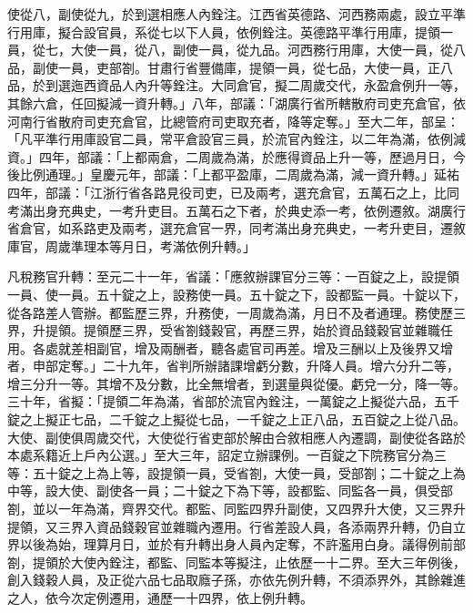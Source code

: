 \begin{pinyinscope}
使從八，副使從九，於到選相應人內銓注。江西省英德路、河西務兩處，設立平準行用庫，擬合設官員，系從七以下人員，依例銓注。英德路平準行用庫，提領一員，從七，大使一員，從八，副使一員，從九品。河西務行用庫，大使一員，從八品，副使一員，吏部劄。甘肅行省豐備庫，提領一員，從七品，大使一員，正八品，於到選迤西資品人內升等銓注。大同倉官，擬二周歲交代，永盈倉例升一等，其餘六倉，任回擬減一資升轉。」八年，部議：「湖廣行省所轄散府司吏充倉官，依河南行省散府司吏充倉官，比總管府司吏取充者，降等定奪。」至大二年，部呈：「凡平準行用庫設官二員，常平倉設官三員，於流官內銓注，以二年為滿，依例減資。」四年，部議：「上都兩倉，二周歲為滿，於應得資品上升一等，歷過月日，今後比例通理。」皇慶元年，部議：「上都平盈庫，二周歲為滿，減一資升轉。」延祐四年，部議：「江浙行省各路見役司吏，已及兩考，選充倉官，五萬石之上，比同考滿出身充典史，一考升吏目。五萬石之下者，於典史添一考，依例遷敘。湖廣行省倉官，如系路吏及兩考，選充倉官一界，同考滿出身充典史，一考升吏目，遷敘庫官，周歲準理本等月日，考滿依例升轉。」



 凡稅務官升轉：至元二十一年，省議：「應敘辦課官分三等：一百錠之上，設提領一員、使一員。五十錠之上，設務使一員。五十錠之下，設都監一員。十錠以下，從各路差人管辦。都監歷三界，升務使，一周歲為滿，月日不及者通理。務使歷三界，升提領。提領歷三界，受省劄錢穀官，再歷三界，始於資品錢穀官並雜職任用。各處就差相副官，增及兩酬者，聽各處官司再差。增及三酬以上及後界又增者，申部定奪。」二十九年，省判所辦諸課增虧分數，升降人員。增六分升二等，增三分升一等。其增不及分數，比全無增者，到選量與從優。虧兌一分，降一等。三十年，省擬：「提領二年為滿，省部於流官內銓注，一萬錠之上擬從六品，五千錠之上擬正七品，二千錠之上擬從七品，一千錠之上正八品，五百錠之上從八品。大使、副使俱周歲交代，大使從行省吏部於解由合敘相應人內遷調，副使從各路於本處系籍近上戶內公選。」至大三年，詔定立辦課例。一百錠之下院務官分為三等：五十錠之上為上等，設提領一員，受省劄，大使一員，受部劄；二十錠之上為中等，設大使、副使各一員；二十錠之下為下等，設都監、同監各一員，俱受部劄，並以一年為滿，齊界交代。都監、同監四界升副使，又四界升大使，又三界升提領，又三界入資品錢穀官並雜職內遷用。行省差設人員，各添兩界升轉，仍自立界以後為始，理算月日，並於有升轉出身人員內定奪，不許濫用白身。議得例前部劄，提領於大使內銓注，都監、同監本等擬注，止依歷一十二界。至大三年例後，創入錢穀人員，及正從六品七品取廕子孫，亦依先例升轉，不須添界外，其餘雜進之人，依今次定例遷用，通歷一十四界，依上例升轉。




\end{pinyinscope}
